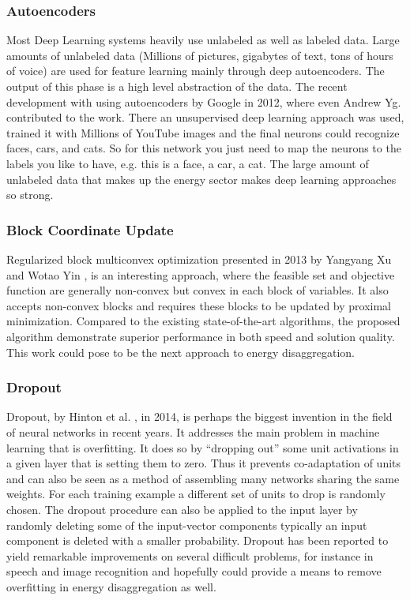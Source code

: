 \subsubsection{Autoencoders}

Most Deep Learning systems heavily use unlabeled as well as labeled data. Large amounts of unlabeled data (Millions of pictures, gigabytes of text, tons of hours of voice) are used for feature learning mainly through deep autoencoders. The output of this phase is a high level abstraction of the data. The recent development with using autoencoders by Google in 2012, where even Andrew Yg. contributed to the work. There an unsupervised deep learning approach was used, trained it with Millions of YouTube images and the final neurons could recognize faces, cars, and cats. So for this network you just need to map the neurons to the labels you like to have, e.g. this is a face, a car, a cat. \cite{google} The large amount of unlabeled data that makes up the energy sector makes deep learning approaches so strong.

\subsubsection{Block Coordinate Update}
\label{sec:bcd}
Regularized block multiconvex optimization presented in 2013 by Yangyang Xu and Wotao Yin \cite{block2}, is an interesting approach, where the feasible set and objective function are generally non-convex but convex in each block of variables. It also accepts non-convex blocks and requires these blocks to be updated by proximal minimization. Compared to the existing state-of-the-art algorithms, the proposed algorithm demonstrate superior performance in both speed and solution quality. This work could pose to be the next approach to energy disaggregation.

\subsubsection{Dropout}
Dropout, by Hinton et al. \cite{dropout}, in 2014, is perhaps the biggest invention in the field of neural networks in recent years. It addresses the main problem in machine learning that is overfitting. It does so by “dropping out” some unit activations in a given layer that is setting them to zero. Thus it prevents co-adaptation of units and can also be seen as a method of assembling many networks sharing the same weights. For each training example a different set of units to drop is randomly chosen. The dropout procedure can also be applied to the input layer by randomly deleting some of the input-vector components typically an input component is deleted with a smaller probability. Dropout has been reported to yield remarkable improvements on several difficult problems, for instance in speech and image recognition and hopefully could provide a means to remove overfitting in energy disaggregation as well. \cite{dropout}

